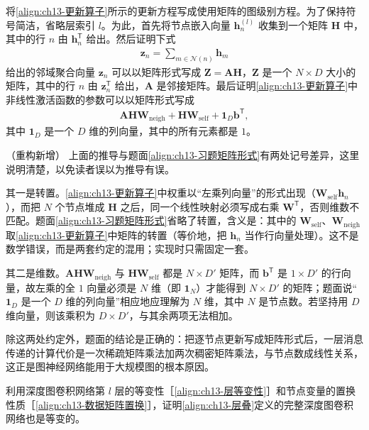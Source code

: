 \documentclass[../../main.tex]{subfiles}
\begin{document}
\begin{exercise}[$\star\star$]\label{exercise:ch13-06}
将\eqref{align:ch13-更新算子}所示的更新方程写成使用矩阵的图级别方程。为了保持符号简洁，省略层索引 $l$。为此，首先将节点嵌入向量 $\bm{h}_n^{(l)}$ 收集到一个矩阵 $\bm{H}$ 中，其中的行 $n$ 由 $\bm{h}_n^{\mathsf T}$ 给出。然后证明下式
\begin{align}
\bm{z}_n=\sum_{m\in\mathcal{N}(n)}\bm{h}_m
\label{align:ch13-习题聚合}
\end{align}
给出的邻域聚合向量 $\bm{z}_n$ 可以以矩阵形式写成 $\bm{Z}=\bm{A}\bm{H}$，$\bm{Z}$ 是一个 $N\times D$ 大小的矩阵，其中的行 $n$ 由 $\bm{z}_n^{\mathsf T}$ 给出，$\bm{A}$ 是邻接矩阵。最后证明\eqref{align:ch13-更新算子}中非线性激活函数的参数可以以矩阵形式写成
\begin{align}
\bm{A}\bm{H}\bm{W}_{\mathrm{neigh}}+\bm{H}\bm{W}_{\mathrm{self}}+\bm{1}_D\bm{b}^{\mathsf T},
\label{align:ch13-习题矩阵形式}
\end{align}
其中 $\bm{1}_D$ 是一个 $D$ 维的列向量，其中的所有元素都是 $1$。
\end{exercise}

\begin{remark}（重构新增）
上面的推导与题面\eqref{align:ch13-习题矩阵形式}有两处记号差异，这里说明清楚，以免读者误以为推导有误。\par
其一是转置。\eqref{align:ch13-更新算子}中权重以“左乘列向量”的形式出现（$\bm{W}_{\mathrm{self}}\bm{h}_n$），而把 $N$ 个节点堆成 $\bm{H}$ 之后，同一个线性映射必须写成右乘 $\bm{W}^{\mathsf T}$，否则维数不匹配。题面\eqref{align:ch13-习题矩阵形式}省略了转置，含义是：其中的 $\bm{W}_{\mathrm{self}}$、$\bm{W}_{\mathrm{neigh}}$ 取\eqref{align:ch13-更新算子}中矩阵的转置（等价地，把 $\bm{h}_n$ 当作行向量处理）。这不是数学错误，而是两套约定的混用；实现时只需固定一套。\par
其二是维数。$\bm{A}\bm{H}\bm{W}_{\mathrm{neigh}}$ 与 $\bm{H}\bm{W}_{\mathrm{self}}$ 都是 $N\times D'$ 矩阵，而 $\bm{b}^{\mathsf T}$ 是 $1\times D'$ 的行向量，故左乘的全 $1$ 向量必须是 $N$ 维（即 $\bm{1}_N$）才能得到 $N\times D'$ 的矩阵；题面说“$\bm{1}_D$ 是一个 $D$ 维的列向量”相应地应理解为 $N$ 维，其中 $N$ 是节点数。若坚持用 $D$ 维向量，则该乘积为 $D\times D'$，与其余两项无法相加。\par
除这两处约定外，题面的结论是正确的：把逐节点更新写成矩阵形式后，一层消息传递的计算代价是一次稀疏矩阵乘法加两次稠密矩阵乘法，与节点数成线性关系，这正是图神经网络能用于大规模图的根本原因。
\end{remark}

\begin{exercise}[$\star\star$]\label{exercise:ch13-07}
利用深度图卷积网络第 $l$ 层的等变性［\eqref{align:ch13-层等变性}］和节点变量的置换性质［\eqref{align:ch13-数据矩阵置换}］，证明\eqref{align:ch13-层叠}定义的完整深度图卷积网络也是等变的。
\end{exercise}
\end{document}

